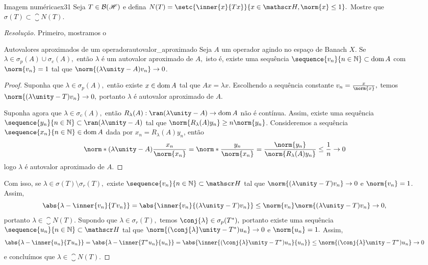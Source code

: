 \begin{exercício}{Imagem numérica}{ex31}
  Seja \(T \in \mathcal{B}(\mathscr{H})\) e defina \(N(T) = \setc{\inner{x}{Tx}}{x \in \hilbert, \norm{x} \leq 1}.\) Mostre que \(\sigma(T) \subset \closure{N(T)}.\)
\end{exercício}
\begin{proof}[Resolução]
  Primeiro, mostramos o
  \begin{lemma}{Autovalores aproximados de um operador}{autovalor_aproximado}
    Seja \(A\) um operador agindo no espaço de Banach \(X\). Se \(\lambda \in \sigma_p(A) \cup \sigma_c(A),\) então \(\lambda\) é um autovalor aproximado de \(A,\) isto é, existe uma sequência \(\sequence{v_n}{n\in\mathbb{N}} \subset \dom{A}\) com \(\norm{v_n} = 1\) tal que \(\norm{(\lambda\unity - A)v_n} \to 0\).
  \end{lemma}
  \begin{proof}
    Suponha que \(\lambda \in \sigma_p(A),\) então existe \(x \in \operatorname{dom}{A}\) tal que \(Ax = \lambda x\). Escolhendo a sequência constante \(v_n = \frac{x}{\norm{x}},\) temos \(\norm{(\lambda \unity - T)v_n} \to 0,\) portanto \(\lambda\) é autovalor aproximado de \(A.\)

    Suponha agora que \(\lambda \in \sigma_c(A),\) então \(R_\lambda(A) : \ran(\lambda \unity - A) \to \dom{A}\) não é contínua. Assim, existe uma sequência \(\sequence{y_n}{n\in\mathbb{N}}\subset \ran(\lambda \unity - A)\) tal que \(\norm{R_\lambda(A)y_n} \geq n\norm{y_n}\). Consideremos a sequência \(\sequence{x_n}{n\in \mathbb{N}} \in \dom{A}\) dada por \(x_n = R_\lambda(A)y_n\), então
    \begin{equation*}
      \norm*{(\lambda \unity - A)\frac{x_n}{\norm{x_n}}} = \norm*{\frac{y_n}{\norm{x_n}}} = \frac{\norm{y_n}}{\norm{R_\lambda(A)y_n}} \leq \frac{1}{n} \to 0
    \end{equation*}
    logo \(\lambda\) é autovalor aproximado de \(A.\)
  \end{proof}
  Com isso, se \(\lambda \in \sigma(T) \setminus \sigma_r(T),\) existe \(\sequence{v_n}{n\in\mathbb{N}} \subset \hilbert\) tal que \(\norm{(\lambda \unity - T)v_n} \to 0\) e \(\norm{v_n} = 1\). Assim,
  \begin{equation*}
    \abs{\lambda - \inner{v_n}{Tv_n}} = \abs{\inner{v_n}{(\lambda \unity - T)v_n}} \leq \norm{v_n} \norm{(\lambda \unity - T)v_n} \to 0,
  \end{equation*}
  portanto \(\lambda \in \closure{N(T)}.\) Supondo que \(\lambda \in \sigma_r(T),\) temos \(\conj{\lambda} \in \sigma_p(T^*),\) portanto existe uma sequência \(\sequence{u_n}{n\in\mathbb{N}} \subset \hilbert\) tal que \(\norm{(\conj{\lambda}\unity - T^*)u_n} \to 0\) e \(\norm{u_n} = 1.\) Assim,
  \begin{equation*}
    \abs{\lambda - \inner{u_n}{Tu_n}} = \abs{\lambda - \inner{T^*u_n}{u_n}} = \abs{\inner{(\conj{\lambda}\unity - T^*)u_n}{u_n}} \leq \norm{(\conj{\lambda}\unity - T^*)u_n} \to 0
  \end{equation*}
  e concluímos que \(\lambda \in \closure{N(T)}.\)
\end{proof}
